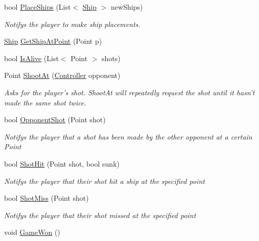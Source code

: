\begin{DoxyCompactItemize}
bool \hyperlink{class_m_b_c_1_1_core_1_1_controller_a5d27318689d6b9e09d6726a433e2b95b}{Place\-Ships} (List$<$ \hyperlink{class_m_b_c_1_1_core_1_1_ship}{Ship} $>$ new\-Ships)
\begin{DoxyCompactList}\small\item\em Notifys the player to make ship placements.\end{DoxyCompactList}\item 
\hyperlink{class_m_b_c_1_1_core_1_1_ship}{Ship} \hyperlink{class_m_b_c_1_1_core_1_1_controller_a21e92036de8a74a82b2d5bc341977359}{Get\-Ship\-At\-Point} (Point p)
\item 
bool \hyperlink{class_m_b_c_1_1_core_1_1_controller_a9e6f3efa65c34223a9753b1c155ef945}{Is\-Alive} (List$<$ Point $>$ shots)
\item 
Point \hyperlink{class_m_b_c_1_1_core_1_1_controller_aee5fa47ba84df60578a2777bd2a77f95}{Shoot\-At} (\hyperlink{class_m_b_c_1_1_core_1_1_controller}{Controller} opponent)
\begin{DoxyCompactList}\small\item\em Asks for the player's shot. Shoot\-At will repeatedly request the shot until it hasn't made the same shot twice.\end{DoxyCompactList}\item 
bool \hyperlink{class_m_b_c_1_1_core_1_1_controller_a5a722dfa61f662d4c6ed9cf1c0f2debc}{Opponent\-Shot} (Point shot)
\begin{DoxyCompactList}\small\item\em Notifys the player that a shot has been made by the other opponent at a certain Point\end{DoxyCompactList}\item 
bool \hyperlink{class_m_b_c_1_1_core_1_1_controller_aa102974b8aeaed8b05a9a9c51793b9d8}{Shot\-Hit} (Point shot, bool sunk)
\begin{DoxyCompactList}\small\item\em Notifys the player that their shot hit a ship at the specified point\end{DoxyCompactList}\item 
bool \hyperlink{class_m_b_c_1_1_core_1_1_controller_a5b6b33ce7d17c2002fe30f89eb22b644}{Shot\-Miss} (Point shot)
\begin{DoxyCompactList}\small\item\em Notifys the player that their shot missed at the specified point\end{DoxyCompactList}\item 
\hypertarget{class_m_b_c_1_1_core_1_1_controller_a48997aafea2900e29f042c71a2131522}{void \hyperlink{class_m_b_c_1_1_core_1_1_controller_a48997aafea2900e29f042c71a2131522}{Game\-Won} ()}\label{class_m_b_c_1_1_core_1_1_controller_a48997aafea2900e29f042c71a2131522}


\end{DoxyCompactItemize}
